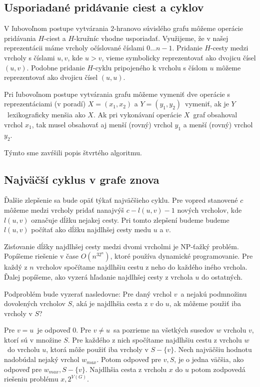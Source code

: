 \subsection{Usporiadané pridávanie ciest a cyklov}

V ľubovoľnom postupe vytvárania $2$-hranovo súvislého grafu môžeme operácie pridávania $H$-ciest
a $H$-kružníc vhodne usporiadať. Využijeme, že v našej reprezentácii máme vrcholy očíslované
číslami $0 \ldots n-1$. Pridanie $H$-cesty medzi vrcholy s číslami $u, v$, kde $u > v$, vieme symbolicky
reprezentovať ako dvojicu čísel $(u,v)$. Podobne pridanie $H$-cyklu pripojeného k vrcholu s číslom $u$
môžeme reprezentovať ako dvojicu čísel $(u,u)$.

Pri ľubovoľnom postupe vytvárania grafu môžeme vymeniť dve operácie s reprezentáciami (v poradí)
$X = (x_1,x_2)$ a $Y = (y_1, y_2)$ vymeniť, ak je $Y$ lexikograficky menšia ako $X$. Ak pri
vykonávaní operácie $X$ graf obsahoval vrchol $x_1$, tak musel obsahovať aj menší (rovný) vrchol $y_1$
a menší (rovný) vrchol $y_2$.

Týmto sme zavŕšili popis štvrtého algoritmu.

\subsection{Najväčší cyklus v grafe znova}

Ďalšie zlepšenie sa bude opäť týkať najväčšieho cyklu. Pre vopred stanovené $c$ môžeme medzi vrcholy
pridať nanajvýš $c - l(u,v) - 1$ nových vrcholov, kde $l(u,v)$ označuje dĺžku nejakej cesty. Pri
tomto zlepšení budeme budeme $l(u,v)$ počítať ako dĺžku najdlhšej cesty medu $u$ a $v$.

Zisťovanie dĺžky najdlhšej cesty medzi dvomi vrcholmi je NP-ťažký problém. Popíšeme riešenie
v čase $O(n^32^n)$, ktoré používa dynamické programovanie. Pre každý z $n$ vrcholov spočítame
najdlhšiu cestu z neho do každého iného vrchola. Ďalej popíšeme, ako vyzerá hľadanie najdlhšej
cesty z vrchola $u$ do ostatných.

Podproblém bude vyzerať nasledovne: Pre daný vrchol $v$ a nejakú podmnožinu dovolených
vrcholov $S$, aká je najdlhšia cesta z $v$ do $u$, ak môžeme použiť iba vrcholy v $S$?

Pre $v = u$ je odpoveď $0$. Pre $v \neq u$ sa pozrieme na všetkých susedov $w$ vrcholu $v$,
ktorí sú v množine $S$. Pre každého z nich spočítame najdlhšiu cestu z vrcholu $w$ do vrcholu
$u$, ktorá môže použiť iba vrcholy v $S - \{v\}$. Nech najväčšiu hodnotu nadobúdal nejaký vrchol
$w_{max}$. Potom odpoveď pre $v, S$, je o jedna väčšia, ako odpoveď pre $w_{max}, S - \{v\}$.
Najdlhšia cesta z vrcholu $x$ do $u$ potom zodpovedá riešeniu problému $x, 2^{V(G)}$.

